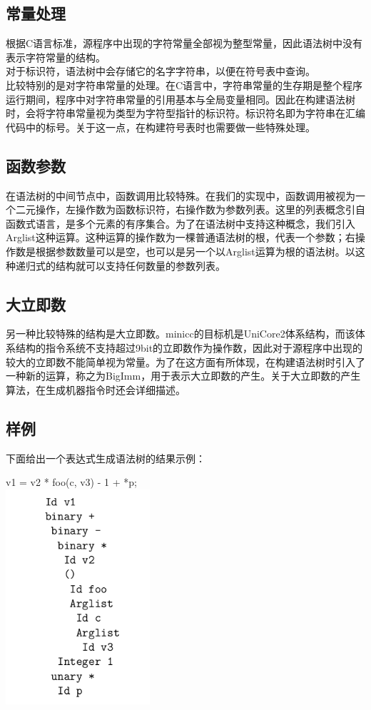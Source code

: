 \documentclass[12pt,a4paper,Flow]{report}
\begin{document}
\subsection{常量处理}
根据C语言标准，源程序中出现的字符常量全部视为整型常量，因此语法树中没有表示字符常量的结构。\\
\indent 对于标识符，语法树中会存储它的名字字符串，以便在符号表中查询。\\
比较特别的是对字符串常量的处理。在C语言中，字符串常量的生存期是整个程序运行期间，程序中对字符串常量的引用基本与全局变量相同。因此在构建语法树时，会将字符串常量视为类型为字符型指针的标识符。标识符名即为字符串在汇编代码中的标号。关于这一点，在构建符号表时也需要做一些特殊处理。\\
\subsection{函数参数}
在语法树的中间节点中，函数调用比较特殊。在我们的实现中，函数调用被视为一个二元操作，左操作数为函数标识符，右操作数为参数列表。这里的列表概念引自函数式语言，是多个元素的有序集合。为了在语法树中支持这种概念，我们引入Arglist这种运算。这种运算的操作数为一棵普通语法树的根，代表一个参数；右操作数是根据参数数量可以是空，也可以是另一个以Arglist运算为根的语法树。以这种递归式的结构就可以支持任何数量的参数列表。
\subsection{大立即数}
另一种比较特殊的结构是大立即数。minicc的目标机是UniCore2体系结构，而该体系结构的指令系统不支持超过9bit的立即数作为操作数，因此对于源程序中出现的较大的立即数不能简单视为常量。为了在这方面有所体现，在构建语法树时引入了一种新的运算，称之为BigImm，用于表示大立即数的产生。关于大立即数的产生算法，在生成机器指令时还会详细描述。
\subsection{样例}
下面给出一个表达式生成语法树的结果示例：
\begin{center}
  v1 = v2 * foo(c, v3) - 1 + *p;\\
  \includegraphics[width=0.4\textwidth]{ast-ex.png}
\end{center}
\end{document}
